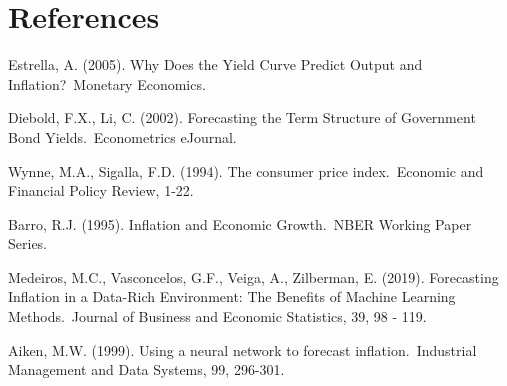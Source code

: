 \documentclass{article}
\begin{document}
\section{References}

Estrella, A. (2005). Why Does the Yield Curve Predict Output and Inflation? Monetary Economics.

Diebold, F.X., Li, C. (2002). Forecasting the Term Structure of Government Bond Yields. Econometrics eJournal.

Wynne, M.A., Sigalla, F.D. (1994). The consumer price index. Economic and Financial Policy Review, 1-22.

Barro, R.J. (1995). Inflation and Economic Growth. NBER Working Paper Series.

Medeiros, M.C., Vasconcelos, G.F., Veiga, A., Zilberman, E. (2019). Forecasting Inflation in a Data-Rich Environment: The Benefits of Machine Learning Methods. Journal of Business and Economic Statistics, 39, 98 - 119.

Aiken, M.W. (1999). Using a neural network to forecast inflation. Industrial Management and Data Systems, 99, 296-301.
\end{document}
